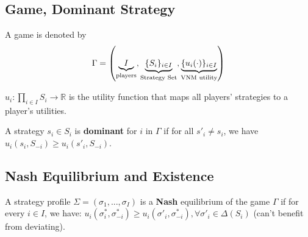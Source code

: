 \documentclass[11pt]{elegantbook}
\begin{document}
\subsection{Game, Dominant Strategy}
A game is denoted by $$\Gamma =\left(\underbrace{I}_{\textnormal{players}},\underbrace{\{S_i\}_{i\in I}}_{\textnormal{Strategy Set}},\underbrace{\{u_i(\cdot)\}_{i\in I}}_{\textnormal{VNM utility}}\right)$$

$u_i:\prod_{i\in I}S_i \rightarrow \mathbb{R}$ is the utility function that maps all players' strategies to a player's utilities.

\begin{definition}
    \normalfont
    A strategy $s_i\in S_i$ is \textbf{dominant} for $i$ in $\Gamma$ if for all $s'_i\neq s_i$, we have $u_i(s_i,S_{-i})\geq u_i(s'_i,S_{-i})$.
\end{definition}

\subsection{Nash Equilibrium and Existence}
\begin{definition}
    \normalfont
    A strategy profile $\Sigma=(\sigma_1,...,\sigma_I)$ is a \textbf{Nash} equilibrium of the game $\Gamma$ if for every $i\in I$, we have: $u_i(\sigma^*_i,\sigma^*_{-i})\geq u_i(\sigma'_i,\sigma^*_{-i}), \forall \sigma'_i\in \Delta(S_i)$ (can't benefit from deviating).
\end{definition}
\end{document}
